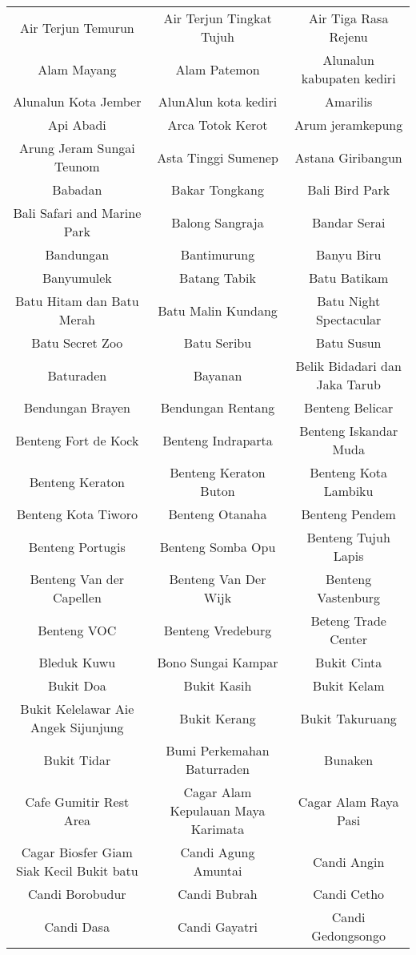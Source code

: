 \begin{table}[H]
\begin{tabular}{ c | c | c }
Air Terjun Temurun & Air Terjun Tingkat Tujuh & Air Tiga Rasa Rejenu\\
Alam Mayang & Alam Patemon & Alunalun kabupaten kediri\\
Alunalun Kota Jember & AlunAlun kota kediri & Amarilis\\
Api Abadi & Arca Totok Kerot & Arum jeramkepung\\
Arung Jeram Sungai Teunom & Asta Tinggi Sumenep & Astana Giribangun\\
Babadan & Bakar Tongkang & Bali Bird Park\\
Bali Safari and Marine Park & Balong Sangraja & Bandar Serai\\
Bandungan & Bantimurung & Banyu Biru\\
Banyumulek & Batang Tabik & Batu Batikam\\
Batu Hitam dan Batu Merah & Batu Malin Kundang & Batu Night Spectacular\\
Batu Secret Zoo & Batu Seribu & Batu Susun\\
Baturaden & Bayanan & Belik Bidadari dan Jaka Tarub\\
Bendungan Brayen & Bendungan Rentang & Benteng Belicar\\
Benteng Fort de Kock & Benteng Indraparta & Benteng Iskandar Muda\\
Benteng Keraton & Benteng Keraton Buton & Benteng Kota Lambiku\\
Benteng Kota Tiworo & Benteng Otanaha & Benteng Pendem\\
Benteng Portugis & Benteng Somba Opu & Benteng Tujuh Lapis\\
Benteng Van der Capellen & Benteng Van Der Wijk & Benteng Vastenburg\\
Benteng VOC & Benteng Vredeburg & Beteng Trade Center\\
Bleduk Kuwu & Bono Sungai Kampar & Bukit Cinta\\
Bukit Doa & Bukit Kasih & Bukit Kelam\\
Bukit Kelelawar Aie Angek Sijunjung & Bukit Kerang & Bukit Takuruang\\
Bukit Tidar & Bumi Perkemahan Baturraden & Bunaken\\
Cafe Gumitir Rest Area & Cagar Alam Kepulauan Maya Karimata & Cagar Alam Raya Pasi\\
Cagar Biosfer Giam Siak Kecil Bukit batu & Candi Agung Amuntai & Candi Angin\\
Candi Borobudur & Candi Bubrah & Candi Cetho\\
Candi Dasa & Candi Gayatri & Candi Gedongsongo\\

\end{tabular}
\end{table}
